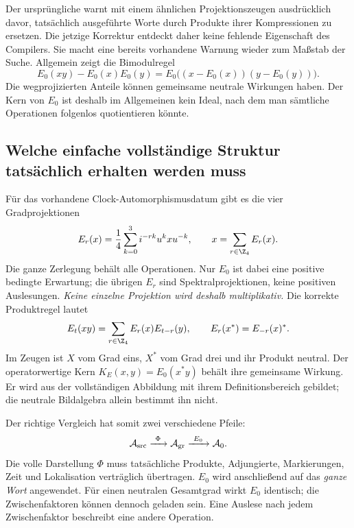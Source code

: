 
Der ursprüngliche  warnt mit einem ähnlichen Projektionszeugen ausdrücklich davor, tatsächlich ausgeführte Worte durch Produkte ihrer Kompressionen zu ersetzen. Die jetzige Korrektur entdeckt daher keine fehlende Eigenschaft des Compilers. Sie macht eine bereits vorhandene Warnung wieder zum Maßstab der Suche. Allgemein zeigt die Bimodulregel
\[
 E_0(xy)-E_0(x)E_0(y)
 =E_0\bigl((x-E_0(x))(y-E_0(y))\bigr).
\]
Die wegprojizierten Anteile können gemeinsame neutrale Wirkungen haben. Der Kern von $E_0$ ist deshalb im Allgemeinen kein Ideal, nach dem man sämtliche Operationen folgenlos quotientieren könnte.

\subsection*{Welche einfache vollständige Struktur tatsächlich erhalten werden muss}
Für das vorhandene Clock-Automorphismusdatum gibt es die vier Gradprojektionen
\[
 E_r(x)=\frac14\sum_{k=0}^{3}i^{-rk}u^kxu^{-k},\qquad
 x=\sum_{r\in\Z_4}E_r(x).
\]
Die ganze Zerlegung behält alle Operationen. Nur $E_0$ ist dabei eine positive bedingte Erwartung; die übrigen $E_r$ sind Spektralprojektionen, keine positiven Auslesungen. \emph{Keine einzelne Projektion wird deshalb multiplikativ.} Die korrekte Produktregel lautet
\[
 E_t(xy)=\sum_{r\in\Z_4}E_r(x)E_{t-r}(y),\qquad
 E_r(x^*)=E_{-r}(x)^*.
\]
Im Zeugen ist $X$ vom Grad eins, $X^*$ vom Grad drei und ihr Produkt neutral. Der operatorwertige Kern $K_E(x,y)=E_0(x^*y)$ behält ihre gemeinsame Wirkung. Er wird aus der vollständigen Abbildung mit ihrem Definitionsbereich gebildet; die neutrale Bildalgebra allein bestimmt ihn nicht.

Der richtige Vergleich hat somit zwei verschiedene Pfeile:
\[
 \mathcal A_{\rm src}\xrightarrow{\ \Phi\ }\mathcal A_{\rm gr}
 \xrightarrow{\ E_0\ }\mathcal A_0.
\]
Die volle Darstellung $\Phi$ muss tatsächliche Produkte, Adjungierte, Markierungen, Zeit und Lokalisation verträglich übertragen. $E_0$ wird anschließend auf das \emph{ganze Wort} angewendet. Für einen neutralen Gesamtgrad wirkt $E_0$ identisch; die Zwischenfaktoren können dennoch geladen sein. Eine Auslese nach jedem Zwischenfaktor beschreibt eine andere Operation.


